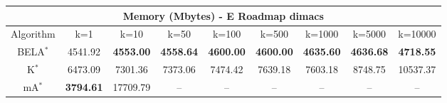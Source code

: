 \begin{tabular}{c|cccccccc}\toprule
\multicolumn{9}{c}{Memory (Mbytes) - E Roadmap dimacs}\\ \midrule
Algorithm & k=1 & k=10 & k=50 & k=100 & k=500 & k=1000 & k=5000 & k=10000 \\ \midrule
BELA$^*$ & 4541.92 & \textbf{4553.00} & \textbf{4558.64} & \textbf{4600.00} & \textbf{4600.00} & \textbf{4635.60} & \textbf{4636.68} & \textbf{4718.55} \\
K$^*$ & 6473.09 & 7301.36 & 7373.06 & 7474.42 & 7639.18 & 7603.18 & 8748.75 & 10537.37 \\
mA$^*$ & \textbf{3794.61} & 17709.79 & -- & -- & -- & -- & -- & -- \\ \bottomrule 
\end{tabular}

